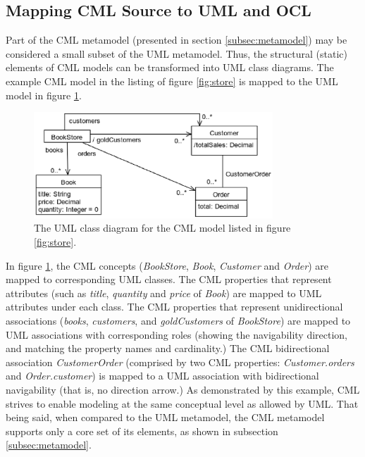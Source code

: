 \subsection{Mapping CML Source to UML and OCL}\label{subsec:mapping}

Part of the CML metamodel (presented in section \ref{subsec:metamodel})
may be considered a small subset of the UML  \cite{uml} metamodel.
Thus, the structural (static) elements of CML models can be transformed into UML class diagrams.
The example CML model in the listing of figure \ref{fig:store} is mapped to the UML model in figure \ref{fig:uml}.

\begin{figure}
\centering
\includegraphics[width=0.8\textwidth]{language/diagram-uml}
\caption{The UML class diagram \cite{uml} for the CML model listed in figure \ref{fig:store}.}
\label{fig:uml}
\end{figure}

In figure \ref{fig:uml},
the CML concepts (\emph{BookStore}, \emph{Book}, \emph{Customer} and \emph{Order})
are mapped to corresponding UML classes.
The CML properties that represent attributes
(such as \emph{title}, \emph{quantity} and \emph{price} of \emph{Book})
are mapped to UML attributes under each class.
The CML properties that represent unidirectional associations
(\emph{books}, \emph{customers}, and \emph{goldCustomers} of \emph{BookStore})
are mapped to UML associations with corresponding roles
(showing the navigability direction, and matching the property names and cardinality.)
The CML bidirectional association \emph{CustomerOrder}
(comprised by two CML properties: \emph{Customer.orders} and \emph{Order.customer})
is mapped to a UML association with bidirectional navigability (that is, no direction arrow.)
As demonstrated by this example,
CML strives to enable modeling at the same conceptual level as allowed by UML.
That being said, when compared to the UML metamodel,
the CML metamodel supports only a core set of its elements,
as shown in subsection \ref{subsec:metamodel}.

